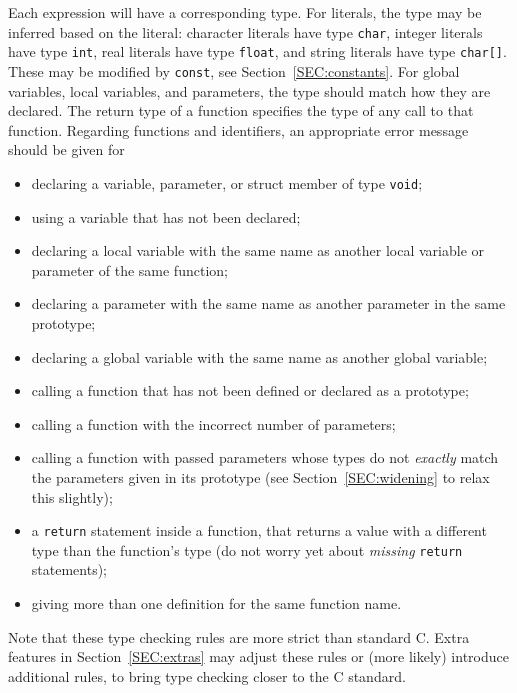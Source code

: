 \documentclass{article}
\newcounter{rule}
\begin{document}
Each expression will have a corresponding type.
For literals, the type may be inferred based on the literal:
character literals have type {\tt char},
integer literals have type {\tt int},
real literals have type {\tt float},
and string literals have type {\tt char[]}.
These may be modified by {\tt const}, see Section~\ref{SEC:constants}.
For global variables, local variables, and parameters,
the type should match how they are declared.
The return type of a function specifies the type of any call to that
function.
Regarding functions and identifiers,
an appropriate error message should be given for
\begin{itemize}
  \item
  declaring a variable, parameter, or struct member
    of type {\tt void};

  \item
  using a variable that has not been declared;

  \item
  declaring a local variable with the same name as another
  local variable or parameter of the same function;

  \item
  declaring a parameter with the same name as another parameter
  in the same prototype;

  \item
  declaring a global variable with the same name as another
  global variable;

  \item
  calling a function that has not been defined or declared as a prototype;

  \item
  calling a function with the incorrect number of parameters;

  \item
  calling a function with passed parameters whose types
  do not \emph{exactly} match the parameters given in its prototype
    (see Section~\ref{SEC:widening} to relax this slightly);

  \item
  a {\tt return} statement inside a function,
  that returns a value with a different type than the function's type
  (do not worry yet about \emph{missing} {\tt return} statements);

  \item
  giving more than one definition for the same function name.

\end{itemize}
Note that these type checking rules are more strict than standard C.
Extra features in Section~\ref{SEC:extras}
may adjust these rules or (more likely)
introduce additional rules,
to bring type checking closer to the C standard.
\end{document}
